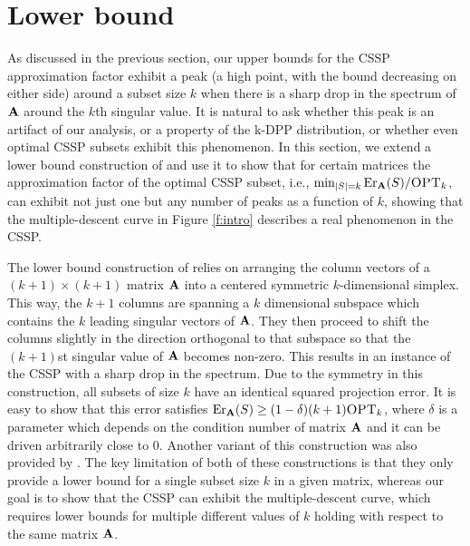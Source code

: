 \documentclass{article}
\begin{document}
 \section{Lower bound}\label{s:lower}
 As discussed in the previous section, our upper bounds for the CSSP
 approximation factor exhibit a peak (a high point,
 with the bound decreasing on either side) around a
 subset size $k$ when there is a sharp drop in the spectrum of $\mathbf A$
 around the $k$th singular value. It is natural to ask whether this
 peak is an artifact of our analysis, or a property of the k-DPP
 distribution, or whether even optimal CSSP subsets exhibit this 
 phenomenon. In this section, we extend a lower
 bound construction of \citet{pca-volume-sampling} and use it to show
 that for certain matrices the approximation factor of the optimal CSSP subset, i.e.,
 $\min_{|S|=k}\mathrm{Er}_\mathbf A(S)/{\textsc{OPT}_k}$, can exhibit not just one but any
 number of peaks as a function of $k$, showing that the
 multiple-descent curve in Figure \ref{f:intro} describes a
real phenomenon in the CSSP.

The lower bound construction of \citet{pca-volume-sampling} relies on
arranging the column vectors of a $(k+1)\times (k+1)$ matrix $\mathbf A$ into a
centered symmetric $k$-dimensional simplex. This way, the $k+1$
columns are spanning a $k$ dimensional subspace which contains the $k$
leading singular vectors of $\mathbf A$. They then proceed to shift the
columns slightly in the direction orthogonal to that subspace so that
the $(k+1)$st singular value of $\mathbf A$ becomes non-zero. This results in
an instance of the CSSP with a sharp drop in the spectrum. Due
to the symmetry in this construction, all subsets of size $k$ have an identical squared
projection error. It is easy to show that this error satisfies $\mathrm{Er}_\mathbf A(S)\geq (1-\delta)(k+1){\textsc{OPT}_k}$,
where $\delta$ is a parameter which depends on the condition number of
matrix $\mathbf A$ and it can be driven arbitrarily close to $0$. Another
variant of this construction was also provided 
by \citet{more-efficient-volume-sampling}. The key limitation of both
of these constructions is that they only provide a lower bound for a
single subset size $k$ in a given matrix, whereas our goal is to show
that the CSSP can exhibit the multiple-descent curve, which requires
lower bounds for multiple different values of $k$ holding with respect
to the same matrix $\mathbf A$.
\end{document}

